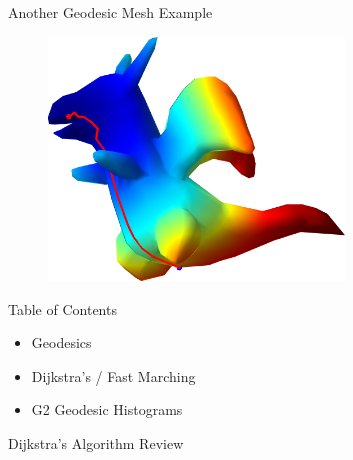 \documentclass{beamer}
\begin{document}
\begin{frame}{Another Geodesic Mesh Example}

\begin{figure}[t]
    \includegraphics[width=0.7\textwidth]{DragonGeodesic.png}
\end{figure}

\end{frame}


\begin{frame}{Table of Contents}

\begin{itemize}[label=$\vartriangleright$]
	\item Geodesics
\end{itemize}

\begin{itemize}[label=$\blacktriangleright$]
	\item Dijkstra's / Fast Marching
\end{itemize}

\begin{itemize}[label=$\vartriangleright$]
	\item G2 Geodesic Histograms
\end{itemize}

\end{frame}

\begin{frame}{Dijkstra's Algorithm Review}
\begin{minipage}{0.75\textwidth}
    
\end{minipage}

\end{frame}
\end{document}
